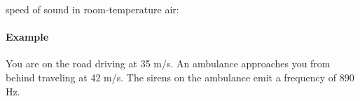 \documentclass[10pt]{exam}
\begin{document}
\begin{multicols}{2}
  \vspace{1em}

  speed of sound in room-temperature air:
  
  \vspace{1em}

  \paragraph{Example}
  You are on the road driving at 35 m/s.  An ambulance approaches you from behind traveling at 42 m/s.  The sirens on the ambulance emit a frequency of 890 Hz.
  
  \vspace{1em}
  


\end{multicols}
\end{document}
